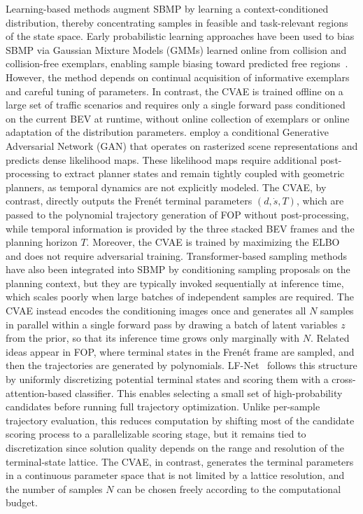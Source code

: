 Learning-based methods augment SBMP by learning a context-conditioned distribution, thereby concentrating samples in feasible and task-relevant regions of the state space.
Early probabilistic learning approaches have been used to bias SBMP via Gaussian Mixture Models (GMMs) learned online from collision and collision-free exemplars, enabling sample biasing toward predicted free regions~\cite{Jinwook2016GMM, Jinwook2017GMM}. However, the method depends on continual acquisition of informative exemplars and careful tuning of parameters.
In contrast, the CVAE is trained offline on a large set of traffic scenarios and requires only a single forward pass conditioned on the current BEV at runtime, without online collection of exemplars or online adaptation of the distribution parameters.
\textcite{Ma2020ConditionalGA} employ a conditional Generative Adversarial Network (GAN) that operates on rasterized scene representations and predicts dense likelihood maps.
These likelihood maps require additional post-processing to extract planner states and remain tightly coupled with geometric planners, as temporal dynamics are not explicitly modeled.
The CVAE, by contrast, directly outputs the Fren\'{e}t terminal parameters $(d, \dot{s}, T)$, which are passed to the polynomial trajectory generation of FOP without post-processing, while temporal information is provided by the three stacked BEV frames and the planning horizon $T$. Moreover, the CVAE is trained by maximizing the ELBO and does not require adversarial training.
Transformer-based sampling methods~\cite{Johnson2023Dictionaries, Lei2024TransformerEnhancedMP, Feng2025rrtformer} have also been integrated into SBMP by conditioning sampling proposals on the planning context, but they are typically invoked sequentially at inference time, which scales poorly when large batches of independent samples are required.
The CVAE instead encodes the conditioning images once and generates all $N$ samples in parallel within a single forward pass by drawing a batch of latent variables $z$ from the prior, so that its inference time grows only marginally with $N$.
Related ideas appear in FOP, where terminal states in the Fren\'{e}t frame are sampled, and then the trajectories are generated by polynomials. LF-Net~\cite{Yu2024LFNet} follows this structure by uniformly discretizing potential terminal states and scoring them with a cross-attention-based classifier. This enables selecting a small set of high-probability candidates before running full trajectory optimization.
Unlike per-sample trajectory evaluation, this reduces computation by shifting most of the candidate scoring process to a parallelizable scoring stage, but it remains tied to discretization since solution quality depends on the range and resolution of the terminal-state lattice.
The CVAE, in contrast, generates the terminal parameters in a continuous parameter space that is not limited by a lattice resolution, and the number of samples $N$ can be chosen freely according to the computational budget.


